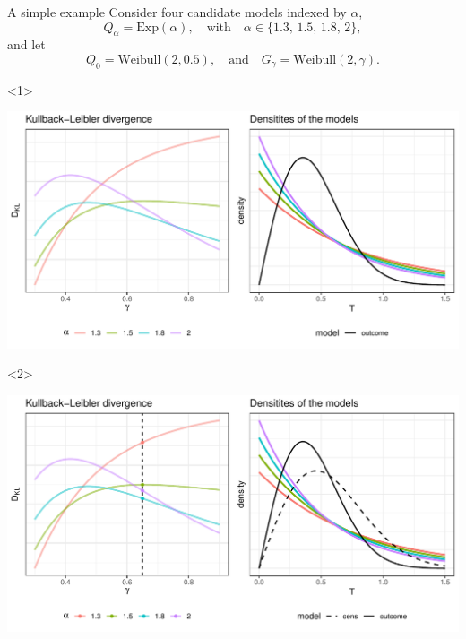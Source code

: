 \documentclass[smaller]{beamer}\usepackage{listings}
\begin{document}
\begin{frame}[label={sec:org635026f}]{A simple example}
\small Consider four candidate models indexed by $\alpha$,
\begin{equation*}
  Q_{\alpha} = \text{Exp}(\alpha),
  \quad \text{with} \quad 
  \alpha \in \{1.3, \,1.5,\, 1.8,\, 2\},
\end{equation*}
and let
\begin{equation*}
  Q_0 = \text{Weibull}(2,  0.5),
  \quad \text{and} \quad
  G_{\gamma} = \text{Weibull}(2,\gamma).
\end{equation*}

\vfill

\begin{onlyenv}<1>
\begin{center}
\includegraphics[width=.9\linewidth]{fig-mix-const-v1.pdf}
\end{center}
\end{onlyenv}

\begin{onlyenv}<2>
\begin{center}
\includegraphics[width=.9\linewidth]{fig-mix-const-v3.pdf}
\end{center}
\end{onlyenv}


\end{frame}
\end{document}
